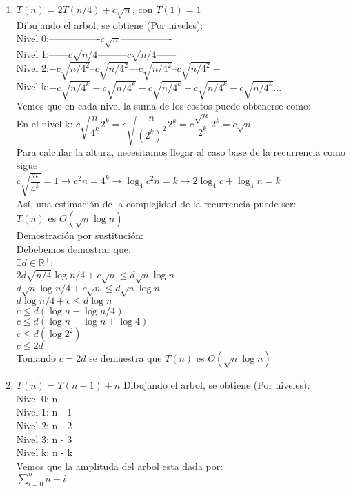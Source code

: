 \documentclass[10pt]{article}
\begin{document}
\begin{enumerate}
\begin{enumerate}
  \item $T(n) = 2T(n/4) + c\sqrt{n}$, con $T(1) = 1$\\
  Dibujando el arbol, se obtiene (Por niveles):\\
  Nivel 0:----------------$c\sqrt{n}$----------------\\
  Nivel 1:------$c\sqrt{n/4}$---------$c\sqrt{n/4}$------\\
  Nivel 2:$-c\sqrt{n/4^2}$--$c\sqrt{n/4^2}$---$c\sqrt{n/4^2}$--$c\sqrt{n/4^2}-$\\
  Nivel k:$-c\sqrt{n/4^k}-c\sqrt{n/4^k}-c\sqrt{n/4^k}-c\sqrt{n/4^k}-c\sqrt{n/4^k}...$\\
  Vemos que en cada nivel la suma de los costos puede obtenerse como:\\
  En el nivel k: $c\sqrt{\dfrac{n}{4^k}}2^k=c\sqrt{\dfrac{n}{(2^k)^2}}2^k=c{\dfrac{\sqrt n}{2^k}}2^k=c\sqrt n$\\
  Para calcular la altura, necesitamos llegar al caso base de la recurrencia como sigue\\$c\sqrt{\dfrac{n}{4^k}}=1\rightarrow c^2 n = 4^k\rightarrow \log_4 {c^2n} = k\rightarrow 2\log_4 c+\log_4 n = k$\\Así, una estimación de la complejidad de la recurrencia puede ser:\\$T(n)$ es $O(\sqrt{n}\log n)$\\Demostración por sustitución:\\
  Debebemos demostrar que:\\ $\exists d\in\mathbb{R^+}$:\\
  $2d\sqrt{n/4}\log n/4 + c\sqrt{n}\leq d\sqrt{n}\log n$\\
  $d\sqrt{n}\log n/4 + c\sqrt{n}\leq d\sqrt{n}\log n$\\
  $d\log n/4 + c\leq d\log n$\\
  $c\leq d(\log n-\log n/4)$\\
  $c\leq d(\log n-\log n + \log 4)$\\
  $c\leq d(\log 2^2)$\\
  $c\leq 2d$\\
  Tomando $c=2d$ se demuestra que $T(n)$ es $O(\sqrt{n}\log n)$\\ 
  \item $T(n) = T(n-1) + n$
  Dibujando el arbol, se obtiene (Por niveles):\\
  Nivel 0: n\\
  Nivel 1: n - 1\\
  Nivel 2: n - 2\\
  Nivel 3: n - 3\\
  Nivel k: n - k\\
  Vemos que la amplituda del arbol esta dada por:\\
  $\sum_{i=0}^{n}n-i$
\end{enumerate}


\end{enumerate}
\end{document}
